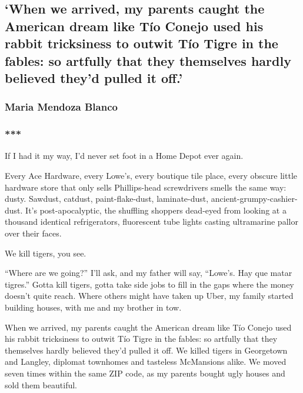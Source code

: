 \hypertarget{when-we-arrived-my-parents-caught-the-american-dream-like-tuxedo-conejo-used-his-rabbit-tricksiness-to-outwit-tuxedo-tigre-in-the-fables-so-artfully-that-they-themselves-hardly-believed-theyd-pulled-it-off}{%
\subsection{`When we arrived, my parents caught the American dream like
Tío Conejo used his rabbit tricksiness to outwit Tío Tigre in the
fables: so artfully that they themselves hardly believed they'd pulled
it
off.'}\label{when-we-arrived-my-parents-caught-the-american-dream-like-tuxedo-conejo-used-his-rabbit-tricksiness-to-outwit-tuxedo-tigre-in-the-fables-so-artfully-that-they-themselves-hardly-believed-theyd-pulled-it-off}}

\hypertarget{maria-mendoza-blanco}{%
\subsubsection{Maria Mendoza Blanco}\label{maria-mendoza-blanco}}

\subsubsection{***}

If I had it my way, I'd never set foot in a Home Depot ever again.

Every Ace Hardware, every Lowe's, every boutique tile place, every
obscure little hardware store that only sells Phillips-head screwdrivers
smells the same way: dusty. Sawdust, catdust, paint-flake-dust,
laminate-dust, ancient-grumpy-cashier-dust. It's post-apocalyptic, the
shuffling shoppers dead-eyed from looking at a thousand identical
refrigerators, fluorescent tube lights casting ultramarine pallor over
their faces.

We kill tigers, you see.

``Where are we going?'' I'll ask, and my father will say, ``Lowe's. Hay
que matar tigres.'' Gotta kill tigers, gotta take side jobs to fill in
the gaps where the money doesn't quite reach. Where others might have
taken up Uber, my family started building houses, with me and my brother
in tow.

When we arrived, my parents caught the American dream like Tío Conejo
used his rabbit tricksiness to outwit Tío Tigre in the fables: so
artfully that they themselves hardly believed they'd pulled it off. We
killed tigers in Georgetown and Langley, diplomat townhomes and
tasteless McMansions alike. We moved seven times within the same ZIP
code, as my parents bought ugly houses and sold them beautiful.

